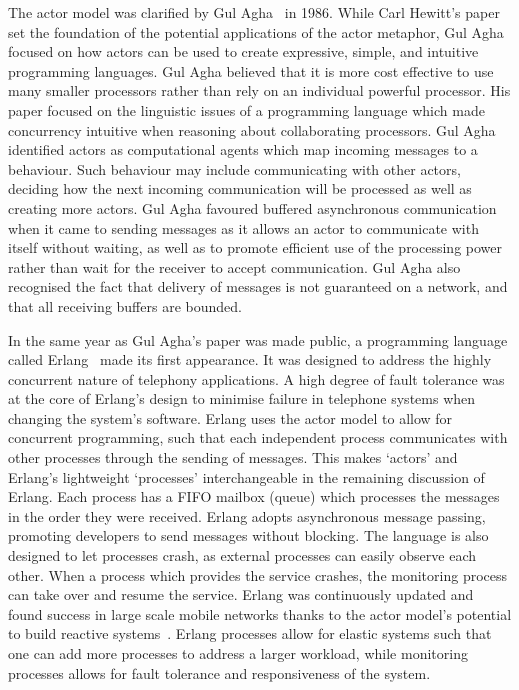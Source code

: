 \documentclass[oneside]{um-fict}
\begin{document}
The actor model was clarified by Gul Agha~\cite{agha1985actors} in 1986. While Carl Hewitt's paper set the foundation of the potential applications of the actor metaphor, Gul Agha focused on how actors can be used to create expressive, simple, and intuitive programming languages. Gul Agha believed that it is more cost effective to use many smaller processors rather than rely on an individual powerful processor. His paper focused on the linguistic issues of a programming language which made concurrency intuitive when reasoning about collaborating processors. Gul Agha identified actors as computational agents which map incoming messages to a behaviour. Such behaviour may include communicating with other actors, deciding how the next incoming communication will be processed as well as creating more actors. Gul Agha favoured buffered asynchronous communication when it came to sending messages as it allows an actor to communicate with itself without waiting, as well as to promote efficient use of the processing power rather than wait for the receiver to accept communication. Gul Agha also recognised the fact that delivery of messages is not guaranteed on a network, and that all receiving buffers are bounded.

In the same year as Gul Agha's paper was made public, a programming language called Erlang~\cite{erlang} made its first appearance. It was designed to address the highly concurrent nature of telephony applications. A high degree of fault tolerance was at the core of Erlang's design to minimise failure in telephone systems when changing the system's software. Erlang uses the actor model to allow for concurrent programming, such that each independent process communicates with other processes through the sending of messages. This makes `actors' and Erlang's lightweight `processes' interchangeable in the remaining discussion of Erlang. Each process has a FIFO mailbox (queue) which processes the messages in the order they were received. Erlang adopts asynchronous message passing, promoting developers to send messages without blocking. The language is also designed to let processes crash, as external processes can easily observe each other. When a process which provides the service crashes, the monitoring process can take over and resume the service. Erlang was continuously updated and found success in large scale mobile networks thanks to the actor model's potential to build reactive systems~\cite{reactivemanifesto}. Erlang processes allow for elastic systems such that one can add more processes to address a larger workload, while monitoring processes allows for fault tolerance and responsiveness of the system. 
\end{document}
